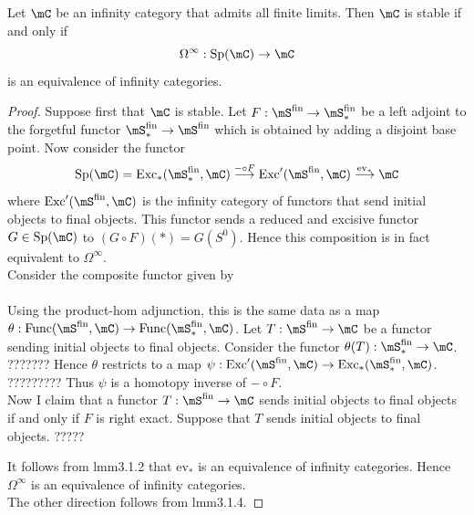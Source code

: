 \documentclass[a4paper]{article}
\begin{document}
\begin{prp}{}{} Let $\mC$ be an infinity category that admits all finite limits. Then $\mC$ is stable if and only if $$\Omega^\infty:\text{Sp}(\mC)\to\mC$$ is an equivalence of infinity categories. 
\begin{proof}
Suppose first that $\mC$ is stable. Let $F:\mS^\text{fin}\to\mS_\ast^\text{fin}$ be a left adjoint to the forgetful functor $\mS_\ast^\text{fin}\to\mS^\text{fin}$ which is obtained by adding a disjoint base point. Now consider the functor $$\text{Sp}(\mC)=\text{Exc}_\ast(\mS_\ast^\text{fin},\mC)\overset{-\circ F}{\longrightarrow}\text{Exc}'(\mS^\text{fin},\mC)\overset{\text{ev}_{\ast}}{\longrightarrow}\mC$$ where $\text{Exc}'(\mS^\text{fin},\mC)$ is the infinity category of functors that send initial objects to final objects. This functor sends a reduced and excisive functor $G\in\text{Sp}(\mC)$ to $(G\circ F)(\ast)=G(S^0)$. Hence this composition is in fact equivalent to $\Omega^\infty$. \\

Consider the composite functor given by \\
\\
Using the product-hom adjunction, this is the same data as a map $\theta:\text{Func}(\mS^\text{fin},\mC)\to\text{Func}(\mS_\ast^\text{fin},\mC)$. Let $T:\mS^\text{fin}\to\mC$ be a functor sending initial objects to final objects. Consider the functor $\theta(T):\mS_\ast^\text{fin}\to\mC$. ??????? Hence $\theta$ restricts to a map $\psi:\text{Exc}'(\mS^\text{fin},\mC)\to\text{Exc}_\ast(\mS_\ast^\text{fin},\mC)$. ????????? Thus $\psi$ is a homotopy inverse of $-\circ F$. \\

Now I claim that a functor $T:\mS^\text{fin}\to\mC$ sends initial objects to final objects if and only if $F$ is right exact. Suppose that $T$ sends initial objects to final objects. ????? 

It follows from lmm3.1.2 that $\text{ev}_\ast$ is an equivalence of infinity categories. Hence $\Omega^\infty$ is an equivalence of infinity categories. \\

The other direction follows from lmm3.1.4. 
\end{proof}
\end{prp}
\end{document}
